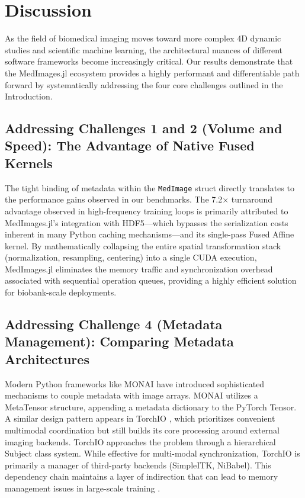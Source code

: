 \documentclass[10pt,letterpaper]{article}
\begin{document}
\section{Discussion}
As the field of biomedical imaging moves toward more complex 4D dynamic studies and scientific machine learning, the architectural nuances of different software frameworks become increasingly critical. Our results demonstrate that the MedImages.jl ecosystem provides a highly performant and differentiable path forward by systematically addressing the four core challenges outlined in the Introduction.

\subsection{Addressing Challenges 1 and 2 (Volume and Speed): The Advantage of Native Fused Kernels}
The tight binding of metadata within the \texttt{MedImage} struct directly translates to the performance gains observed in our benchmarks. The 7.2$\times$ turnaround advantage observed in high-frequency training loops is primarily attributed to MedImages.jl's integration with HDF5---which bypasses the serialization costs inherent in many Python caching mechanisms---and its single-pass Fused Affine kernel. By mathematically collapsing the entire spatial transformation stack (normalization, resampling, centering) into a single CUDA execution, MedImages.jl eliminates the memory traffic and synchronization overhead associated with sequential operation queues, providing a highly efficient solution for biobank-scale deployments.

\subsection{Addressing Challenge 4 (Metadata Management): Comparing Metadata Architectures}
Modern Python frameworks like MONAI \cite{CardosoLi2022} have introduced sophisticated mechanisms to couple metadata with image arrays. MONAI utilizes a MetaTensor structure, appending a metadata dictionary to the PyTorch Tensor. A similar design pattern appears in TorchIO \cite{perezgarcia2021torchio}, which prioritizes convenient multimodal coordination but still builds its core processing around external imaging backends. TorchIO approaches the problem through a hierarchical Subject class system. While effective for multi-modal synchronization, TorchIO is primarily a manager of third-party backends (SimpleITK, NiBabel). This dependency chain maintains a layer of indirection that can lead to memory management issues in large-scale training \cite{perezgarcia2021torchio}.
\end{document}
